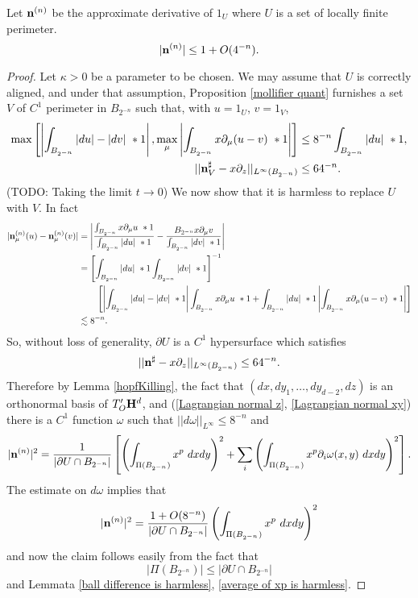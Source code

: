 \begin{lemma}\label{normal has length 1}
Let $\mathbf n^{(n)}$ be the approximate derivative of $1_U$ where $U$ is a set of locally finite perimeter.
$$|\mathbf n^{(n)}| \leq 1 + O(4^{-n}).$$
\end{lemma}
\begin{proof}
Let $\kappa > 0$ be a parameter to be chosen.
We may assume that $U$ is correctly aligned, and under that assumption, Proposition \ref{mollifier quant} furnishes a set $V$ of $C^1$ perimeter in $B_{2^{-n}}$ such that, with $u = 1_U$, $v = 1_V$,
\begin{align*}
\max\left[\left|\int_{B_{2^{-n}}} |du| - |dv| ~*1\right|, \max_\mu \left|\int_{B_{2^{-n}}} x\partial_\mu(u - v) ~*1\right|\right] &\leq 8^{-n} \int_{B_{2^{-n}}} |du| ~*1, \\
||\mathbf n^\sharp_V - x\partial_z||_{L^\infty(B_{2^{-n}})} &\leq 64^{-n}.
\end{align*}
(TODO: Taking the limit $t \to 0$)
We now show that it is harmless to replace $U$ with $V$. In fact
\begin{align*}
|\mathbf n^{(n)}_\mu(u) - \mathbf n^{(n)}_\mu(v)|
&= \left|\frac{\int_{B_{2^{-n}}} x\partial_\mu u ~*1}{\int_{B_{2^{-n}}} |du| ~*1} - \frac{B_{2^{-n}} x\partial_\mu v}{\int_{B_{2^{-n}}} |dv| ~*1}\right|\\
&= \left[\int_{B_{2^{-n}}} |du| ~*1 \int_{B_{2^{-n}}} |dv| ~*1\right]^{-1} \\
&\qquad \left[\left|\int_{B_{2^{-n}}} |du| - |dv| ~*1\right| \int_{B_{2^{-n}}} x\partial_\mu u ~*1+ \int_{B_{2^{-n}}} |du| ~*1 \left|\int_{B_{2^{-n}}} x\partial_\mu(u - v) ~*1\right|\right] \\
&\lesssim 8^{-n}.
\end{align*}
So, without loss of generality, $\partial U$ is a $C^1$ hypersurface which satisfies
$$||\mathbf n^\sharp - x\partial_z||_{L^\infty(B_{2^{-n}})} \leq 64^{-n}.$$
Therefore by Lemma \ref{hopfKilling}, the fact that $(dx, dy_1, \dots, dy_{d-2}, dz)$ is an orthonormal basis of $T'_O\mathbf H^d$, and (\ref{Lagrangian normal z}, \ref{Lagrangian normal xy}) there is a $C^1$ function $\omega$ such that $||d\omega||_{L^\infty} \leq 8^{-n}$ and
$$|\mathbf n^{(n)}|^2 = \frac{1}{|\partial U \cap B_{2^{-n}}|} \left[\left(\int_{\Pi(B_{2^{-n}})} x^p ~dxdy\right)^2 + \sum_i \left(\int_{\Pi(B_{2^{-n}})} x^p \partial_i \omega(x, y) ~dxdy\right)^2\right].$$
The estimate on $d\omega$ implies that
$$|\mathbf n^{(n)}|^2 = \frac{1 + O(8^{-n})}{|\partial U \cap B_{2^{-n}}|}\left(\int_{\Pi(B_{2^{-n}})} x^p ~dxdy\right)^2$$
and now the claim follows easily from the fact that
$$|\Pi(B_{2^{-n}})| \leq |\partial U \cap B_{2^{-n}}|$$
and Lemmata \ref{ball difference is harmless}, \ref{average of xp is harmless}.
\end{proof}

